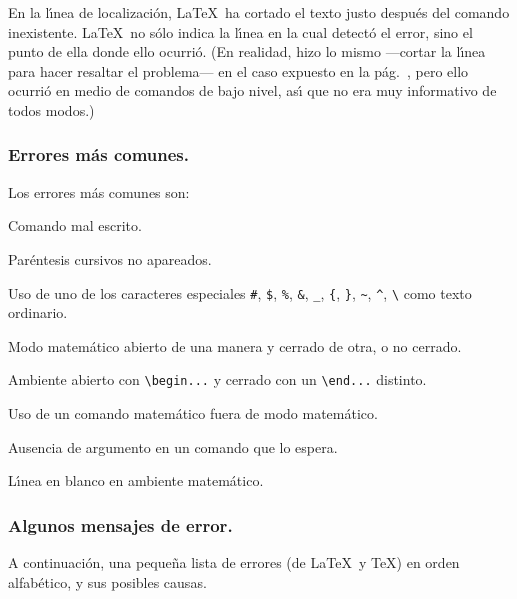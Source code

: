 En la l\'{\i}nea de localizaci{\'o}n, \LaTeX\ ha cortado el texto
justo despu{\'e}s del comando inexistente. \LaTeX\ no s{\'o}lo indica la
l\'{\i}nea en la cual detect{\'o} el error, sino el punto de ella donde
ello ocurri{\'o}. (En realidad, hizo lo mismo ---cortar la l\'{\i}nea
para hacer resaltar el problema--- en el caso expuesto en la
p{\'a}g.\ \pageref{itemie},  pero ello ocurri{\'o} en medio de comandos
de bajo nivel, as\'{\i} que no era muy informativo de todos modos.)

\subsubsection{Errores m{\'a}s comunes.}
\label{comunes}

Los errores m{\'a}s comunes son:
\begin{list}{)}{%
\renewcommand{\theenumi}{\alph{enumi})}}
\item Comando mal escrito.
\label{mal}
\item Par{\'e}ntesis cursivos no apareados.
\label{cursivos}
\item Uso de uno de los caracteres especiales \verb+#+, \verb+$+,
\verb+%+, \verb+&+, \verb+_+, \verb+{+, \verb+}+, \verb+~+, \verb+^+,
\verb+\+ como texto ordinario.
\label{especiales}
\item Modo matem{\'a}tico abierto de una manera y cerrado de otra, o no
cerrado. 
\label{endmath}
\item Ambiente abierto con \verb+\begin...+ y cerrado con un
\verb+\end...+ distinto.
\label{endgroup}
\item Uso de un comando matem{\'a}tico fuera de modo matem{\'a}tico.
\label{mathmode}
\item Ausencia de argumento en un comando que lo espera.
\label{argumento}
\item L\'{\i}nea en blanco en ambiente matem{\'a}tico.
\label{blank}
\end{list}

\subsubsection{Algunos mensajes de error.}

A continuaci{\'o}n, una peque{\~n}a lista de errores (de \LaTeX\ y \TeX)
en orden alfab{\'e}tico, y sus posibles causas.

